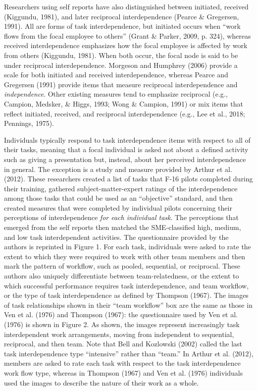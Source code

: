 \documentclass[english,,man]{apa6}
\theoremstyle{definition}
\theoremstyle{definition}
\theoremstyle{definition}
\theoremstyle{remark}
\begin{document}
Researchers using self reports have also distinguished between
initiated, received (Kiggundu, 1981), and later reciprocal
interdependence (Pearce \& Gregersen, 1991). All are forms of task
interdependence, but initiated occurs when \enquote{work flows from the
focal employee to others} (Grant \& Parker, 2009, p. 324), whereas
received interdependence emphasizes how the focal employee is affected
by work from others (Kiggundu, 1981). When both occur, the focal node is
said to be under reciprocal interdependence. Morgeson and Humphrey
(2006) provide a scale for both initiated and received interdependence,
whereas Pearce and Gregersen (1991) provide items that measure
reciprocal interdependence and \emph{independence}. Other existing
measures tend to emphasize reciprocal (e.g., Campion, Medsker, \& Higgs,
1993; Wong \& Campion, 1991) or mix items that reflect initiated,
received, and reciprocal interdependence (e.g., Lee et al., 2018;
Pennings, 1975).

Individuals typically respond to task interdependence items with respect
to all of their tasks, meaning that a focal individual is asked not
about a defined activity such as giving a presentation but, instead,
about her perceived interdependence in general. The exception is a study
and measure provided by Arthur et al. (2012). These researchers created
a list of tasks that F-16 pilots completed during their training,
gathered subject-matter-expert ratings of the interdependence among
those tasks that could be used as an \enquote{objective} standard, and
then created measures that were completed by individual pilots
concerning their perceptions of interdependence \emph{for each
individual task}. The perceptions that emerged from the self reports
then matched the SME-classified high, medium, and low task
interdependent activities. The questionnaire provided by the authors is
reprinted in Figure 1. For each task, individuals were asked to rate the
extent to which they were required to work with other team members and
then mark the pattern of workflow, such as pooled, sequential, or
reciprocal. These authors also uniquely differentiate between
team-relatedness, or the extent to which successful performance requires
task interdependence, and team workflow, or the type of task
interdependence as defined by Thompson (1967). The images of task
relationships shown in their \enquote{team workflow} box are the same as
those in Ven et al. (1976) and Thompson (1967): the questionnaire used
by Ven et al. (1976) is shown in Figure 2. As shown, the images
represent increasingly task interdependent work arrangements, moving
from independent to sequential, reciprocal, and then team. Note that
Bell and Kozlowski (2002) called the last task interdependence type
\enquote{intensive} rather than \enquote{team.} In Arthur et al. (2012),
members are asked to rate each task with respect to the task
interdependence work flow type, whereas in Thompson (1967) and Ven et
al. (1976) individuals used the images to describe the nature of their
work as a whole.
\end{document}
